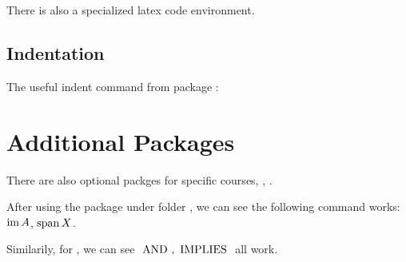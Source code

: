 \documentclass[12pt, orange, night, 0.5in]{alittlebear}
\begin{document}
There is also a specialized latex code environment.

\begin{latexcode}
\end{latexcode}

\subsection{Indentation}

The useful indent command from package :



\np
\section{Additional Packages}

There are also optional packges for specific courses, \eg, .

After using the  package under folder , we can see the following command works: $\operatorname{im} A$, $\operatorname{span} X$.

Similarily, for , we can see $\,\,\mathrm{AND}\,\,, \,\,\mathrm{IMPLIES}\,\,$ all work.
\end{document}
